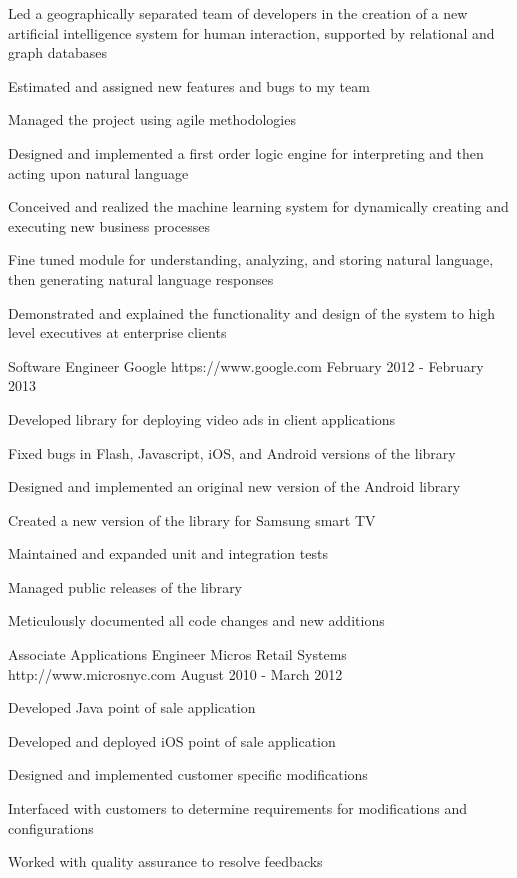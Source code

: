 \documentclass[11pt, a4paper]{awesome-cv}
\begin{document}
\begin{cventries}
{\begin{cvitems}
        \item {Led a geographically separated team of developers in the creation of a new artificial intelligence system for human interaction, supported by relational and graph databases}\item {Estimated and assigned new features and bugs to my team}\item {Managed the project using agile methodologies}\item {Designed and implemented a first order logic engine for interpreting and then acting upon natural language}\item {Conceived and realized the machine learning system for dynamically creating and executing new business processes}\item {Fine tuned module for understanding, analyzing, and storing natural language, then generating natural language responses}\item {Demonstrated and explained the functionality and design of the system to high level executives at enterprise clients}
      \end{cvitems}
    }
  \cventry
    {Software Engineer}
    {Google}
    {https://www.google.com}
    {February 2012 - February 2013}
    {
      \begin{cvitems}
        \item {Developed library for deploying video ads in client applications}\item {Fixed bugs in Flash, Javascript, iOS, and Android versions of the library}\item {Designed and implemented an original new version of the Android library}\item {Created a new version of the library for Samsung smart TV}\item {Maintained and expanded unit and integration tests}\item {Managed public releases of the library}\item {Meticulously documented all code changes and new additions}
      \end{cvitems}
    }
  \cventry
    {Associate Applications Engineer}
    {Micros Retail Systems}
    {http://www.microsnyc.com}
    {August 2010 - March 2012}
    {
      \begin{cvitems}
        \item {Developed Java point of sale application}\item {Developed and deployed iOS point of sale application}\item {Designed and implemented customer specific modifications}\item {Interfaced with customers to determine requirements for modifications and configurations}\item {Worked with quality assurance to resolve feedbacks}

\end{cvitems}}
\end{cventries}
\end{document}
